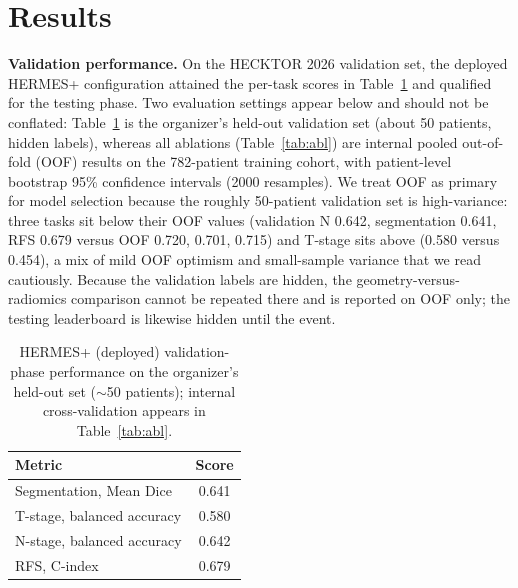 \documentclass[runningheads]{llncs}
\begin{document}
\section{Results}
\label{sec:results}

\textbf{Validation performance.} On the HECKTOR 2026 validation set, the deployed HERMES+ configuration attained the per-task scores in Table~\ref{tab:val} and qualified for the testing phase. Two evaluation settings appear below and should not be conflated: Table~\ref{tab:val} is the organizer's held-out validation set (about 50 patients, hidden labels), whereas all ablations (Table~\ref{tab:abl}) are internal pooled out-of-fold (OOF) results on the 782-patient training cohort, with patient-level bootstrap 95\% confidence intervals (2000 resamples). We treat OOF as primary for model selection because the roughly 50-patient validation set is high-variance: three tasks sit below their OOF values (validation N 0.642, segmentation 0.641, RFS 0.679 versus OOF 0.720, 0.701, 0.715) and T-stage sits above (0.580 versus 0.454), a mix of mild OOF optimism and small-sample variance that we read cautiously. Because the validation labels are hidden, the geometry-versus-radiomics comparison cannot be repeated there and is reported on OOF only; the testing leaderboard is likewise hidden until the event.

\begin{table}[t]
\centering
\caption{HERMES+ (deployed) validation-phase performance on the organizer's held-out set ($\sim$50 patients); internal cross-validation appears in Table~\ref{tab:abl}.}
\label{tab:val}
\begin{tabular}{lc}
\toprule
Metric & Score \\
\midrule
Segmentation, Mean Dice & 0.641 \\
T-stage, balanced accuracy & 0.580 \\
N-stage, balanced accuracy & 0.642 \\
RFS, C-index & 0.679 \\
\bottomrule
\end{tabular}
\end{table}
\end{document}

